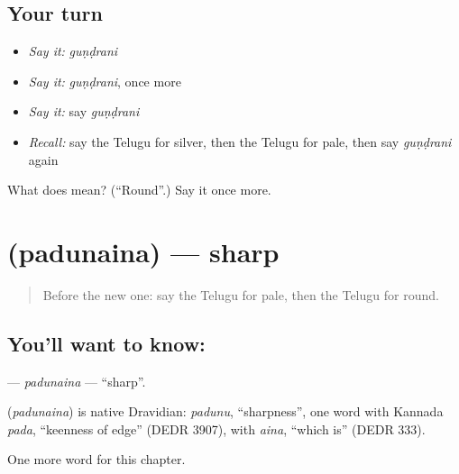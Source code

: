 \subsection*{Your turn}
\begin{itemize}
\raggedright
  \item \emph{Say it:} \emph{guṇḍrani}
  \item \emph{Say it:} \emph{guṇḍrani}, once more
  \item \emph{Say it:} say \emph{guṇḍrani}
  \item \emph{Recall:} say the Telugu for silver, then the Telugu for pale, then say \emph{guṇḍrani} again
\end{itemize}

\begin{tcolorbox}[breakable,colback=teal!4,colframe=teal!35!black,title={Before you move on}]
What does  mean? (\textquotedblleft{}Round\textquotedblright{}.) Say it once more.
\end{tcolorbox}
\section[\texorpdfstring{\te{పదునైన} (padunaina)}{పదునైన (padunaina)}]{ (padunaina) — sharp}

\label{lesson:TE-C221-padunaina}



\begin{quote}
Before the new one: say the Telugu for pale, then the Telugu for round.
\end{quote}

\subsection*{You'll want to know: }
\textbf{} — \emph{padunaina} — \textquotedblleft{}sharp\textquotedblright{}.

\begin{cousinweb}
\textbf{} (\emph{padunaina}) is native Dravidian: \emph{padunu}, \textquotedblleft{}sharpness\textquotedblright{}, one word with Kannada \emph{pada}, \textquotedblleft{}keenness of edge\textquotedblright{} (DEDR 3907), with \emph{aina}, \textquotedblleft{}which is\textquotedblright{} (DEDR 333).
\end{cousinweb}

\begin{grammarlens}[title={What you've built}]
One more word for this chapter.
\end{grammarlens}

